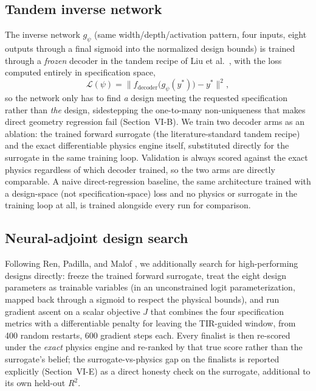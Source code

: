 \documentclass[10pt,twocolumn]{article}
\begin{document}
\subsection{Tandem inverse network}
The inverse network $g_\psi$ (same width/depth/activation pattern, four
inputs, eight outputs through a final sigmoid into the normalized design
bounds) is trained through a \emph{frozen} decoder in the tandem recipe of
Liu et al.\ \cite{liu2018}, with the loss computed entirely in specification
space,
\begin{equation}
\mathcal{L}(\psi) = \big\| f_{\mathrm{decoder}}\big(g_\psi(y^*)\big) -
y^* \big\|^2,
\end{equation}
so the network only has to find \emph{a} design meeting the requested
specification rather than \emph{the} design, sidestepping the one-to-many
non-uniqueness that makes direct geometry regression fail (Section~VI-B).
We train two decoder arms as an ablation: the trained forward surrogate
(the literature-standard tandem recipe) and the exact differentiable
physics engine itself, substituted directly for the surrogate in the same
training loop. Validation is always scored against the exact physics
regardless of which decoder trained, so the two arms are directly
comparable. A naive direct-regression baseline, the same
architecture trained with a design-space (not specification-space) loss
and no physics or surrogate in the training loop at all, is
trained alongside every run for comparison.

\subsection{Neural-adjoint design search}
Following Ren, Padilla, and Malof \cite{ren2020}, we additionally search
for high-performing designs directly: freeze the trained forward surrogate,
treat the eight design parameters as trainable variables (in an
unconstrained logit parameterization, mapped back through a sigmoid to
respect the physical bounds), and run gradient ascent on a scalar objective
$J$ that combines the four specification metrics with a differentiable
penalty for leaving the TIR-guided window, from 400 random restarts, 600
gradient steps each. Every finalist is then re-scored under the
\emph{exact} physics engine and re-ranked by that true score rather than
the surrogate's belief; the surrogate-vs-physics gap on the finalists is
reported explicitly (Section~VI-E) as a direct honesty check on the
surrogate, additional to its own held-out $R^2$.
\end{document}

